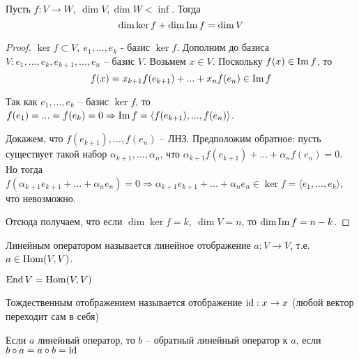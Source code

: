 \begin{Thm}
	Пусть $f: V \to W, \ \dim V, \dim W < \inf$. Тогда
	$$\dim \ker f + \dim \operatorname{Im} f = \dim V$$
\end{Thm}

\begin{proof}
	$\ker f \subset V, \ e_1,...,e_k$ - базис $\ker f$. Дополним до базиса $V: e_1, ..., e_k, e_{k+1},..., e_n $ -- базис $V$. 
	Возьмем $x \in V$. Поскольку $f(x) \in \operatorname{Im} f$, то 
	\[f(x) = x_{k+1} f(e_{k+1}) + ... + x_n f(e_n) \in \operatorname{Im} f\]

	Так как $e_1, ..., e_k$ -- базис $\ker f$, то $f(e_1) = ... = f(e_k) = 0 \Rightarrow \operatorname{Im} f = \langle f(e_{k+1}), ..., f(e_n) \rangle $. 

	Докажем, что $f(e_{k+1}), ..., f(e_n)$ -- ЛНЗ. 
	Предположим обратное: пусть существует такой набор $\alpha_{k + 1}, ..., \alpha_n$, что $\alpha_{k+1} f(e_{k+1}) + ... + \alpha_n  f(e_n) = 0$. Но тогда $f(\alpha_{k+1}e_{k+1} + ... + \alpha_n e_n) = 0 \Rightarrow\alpha_{k+1} e_{k+1} + ... + \alpha_n e_n \in \ker f = \langle e_1, ..., e_k\rangle$, что невозможно.

	Отсюда получаем, что если $\dim \ker f = k, \ \dim V = n$, то $\dim \operatorname{Im} f = n - k$. 
\end{proof}


\begin{Def}
	Линейным оператором называется линейное отображение $a: V \to V$, т.е. $a \in \operatorname{Hom}(V, V)$.
\end{Def}

\begin{notation}
	$\operatorname{End} V = \operatorname{Hom}(V, V)$
\end{notation}

\begin{Def}
	Тождественным отображением называется отображение $\operatorname{id}: x \to x$ (любой вектор переходит сам в себя)
\end{Def}

\begin{Def}
	Если $a$ линейный оператор, то $b$ -- обратный линейный оператор к $a$, если $b \circ a = a \circ b = \operatorname{id}$
\end{Def}

